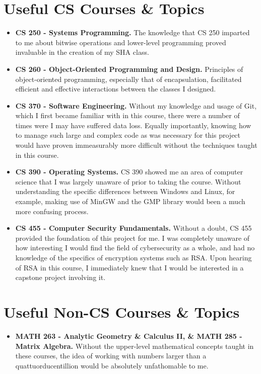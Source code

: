 \documentclass[11pt]{article}
\begin{document}
\section{Useful CS Courses \& Topics}
\begin{itemize}
\item{\textbf{CS 250 - Systems Programming.} The knowledge that CS 250 imparted to me about bitwise operations and lower-level programming proved invaluable in the creation of my SHA class.}
\item{\textbf{CS 260 - Object-Oriented Programming and Design.} Principles of object-oriented programming, especially that of encapsulation, facilitated efficient and effective interactions between the classes I designed.}
\item{\textbf{CS 370 - Software Engineering.} Without my knowledge and usage of Git, which I first became familiar with in this course, there were a number of times were I may have suffered data loss. Equally importantly, knowing how to manage such large and complex code as was necessary for this project would have proven immeasurably more difficult without the techniques taught in this course.}
\item{\textbf{CS 390 - Operating Systems.} CS 390 showed me an area of computer science that I was largely unaware of prior to taking the course. Without understanding the specific differences between Windows and Linux, for example, making use of MinGW and the GMP library would been a much more confusing process.}
\item{\textbf{CS 455 - Computer Security Fundamentals.} Without a doubt, CS 455 provided the foundation of this project for me. I was completely unaware of how interesting I would find the field of cybersecurity as a whole, and had no knowledge of the specifics of encryption systems such as RSA. Upon hearing of RSA in this course, I immediately knew that I would be interested in a capstone project involving it.}
\end{itemize}

\section{Useful Non-CS Courses \& Topics}
\begin{itemize}
\item{\textbf{MATH 263 - Analytic Geometry \& Calculus II, \& MATH 285 - Matrix Algebra.} Without the upper-level mathematical concepts taught in these courses, the idea of working with numbers larger than a quattuorducentillion would be absolutely unfathomable to me.}
\end{itemize}
\end{document}
